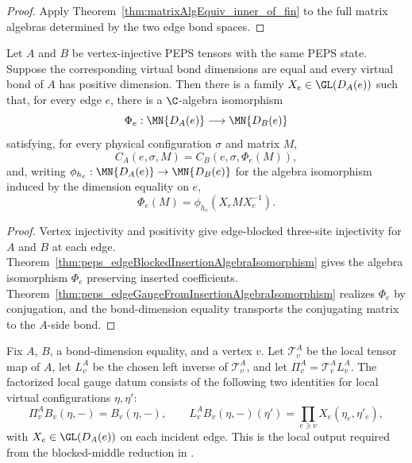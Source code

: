 \begin{proof}\leanok
    Apply Theorem~\ref{thm:matrixAlgEquiv_inner_of_fin} to the full matrix
    algebras determined by the two edge bond spaces.
\end{proof}

\begin{theorem}%
    \label{thm:peps_exists_edgeGaugeFamily}
    \leanok
    Let $A$ and $B$ be vertex-injective PEPS tensors with the same PEPS state.
    Suppose the corresponding virtual bond dimensions are equal and every
    virtual bond of $A$ has positive dimension. Then there is a family
    $X_e\in\GL(D_A(e))$ such that, for every edge $e$, there is a
    $\C$-algebra isomorphism
    \[
        \Phi_e:\MN{D_A(e)}\longrightarrow\MN{D_B(e)}
    \]
    satisfying, for every physical configuration $\sigma$ and matrix $M$,
    \[
        C_A(e,\sigma,M)=C_B(e,\sigma,\Phi_e(M)),
    \]
    and, writing $\phi_{h_e}:\MN{D_A(e)}\to\MN{D_B(e)}$ for the algebra
    isomorphism induced by the dimension equality on $e$,
    \[
        \Phi_e(M)=\phi_{h_e}\!\left(X_eMX_e^{-1}\right).
    \]
\end{theorem}

\begin{proof}\leanok
    Vertex injectivity and positivity give edge-blocked three-site injectivity
    for $A$ and $B$ at each edge. Theorem~\ref{thm:peps_edgeBlockedInsertionAlgebraIsomorphism}
    gives the algebra isomorphism $\Phi_e$ preserving inserted coefficients.
    Theorem~\ref{thm:peps_edgeGaugeFromInsertionAlgebraIsomorphism} realizes
    $\Phi_e$ by conjugation, and the bond-dimension equality transports the
    conjugating matrix to the $A$-side bond.
\end{proof}

\begin{definition}%
    \label{def:peps_hasFactorizedLocalGauge}
    \leanok
    Fix $A$, $B$, a bond-dimension equality, and a vertex $v$. Let
    $\mathcal T^A_v$ be the local tensor map of $A$, let $L^A_v$ be the
    chosen left inverse of $\mathcal T^A_v$, and let
    $\Pi^A_v=\mathcal T^A_vL^A_v$. The factorized local gauge datum consists
    of the following two identities for local virtual configurations
    $\eta,\eta'$:
    \[
        \Pi^A_v B_v(\eta,-)=B_v(\eta,-),
        \qquad
        L^A_vB_v(\eta,-)(\eta')
        =
        \prod_{e\ni v}X_e(\eta_e,\eta'_e),
    \]
    with $X_e\in\GL(D_A(e))$ on each incident edge. This is the local output
    required from the blocked-middle reduction in
    \cite[Section~3]{Molnar2018NormalPEPS}.
\end{definition}

